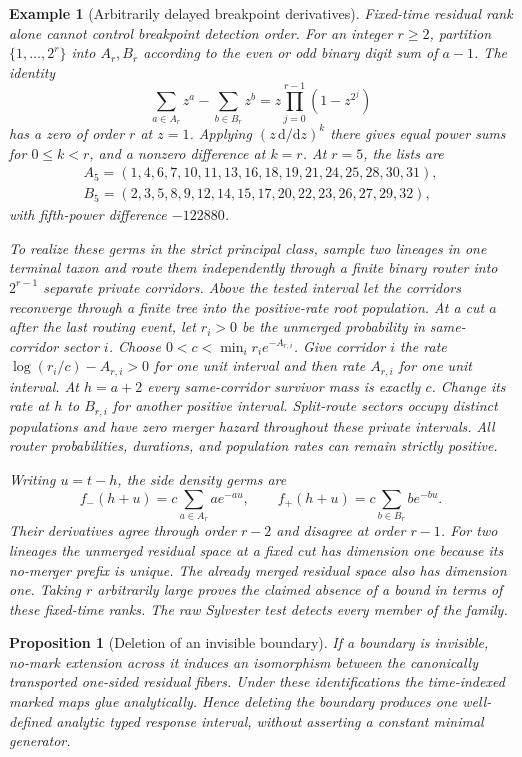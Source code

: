 \documentclass[11pt]{article}
\newtheorem{proposition}[theorem]{Proposition}
\newtheorem{example}[theorem]{Example}
\begin{document}
\begin{example}[Arbitrarily delayed breakpoint derivatives]
\label{ex:supp-high-order-breakpoint}
Fixed-time residual rank alone cannot control breakpoint detection order.  For an integer $r\ge2$, partition $\{1,\ldots,2^r\}$ into $A_r,B_r$ according to the even or odd binary digit sum of $a-1$.  The identity
\[
\sum_{a\in A_r}z^a-\sum_{b\in B_r}z^b
=z\prod_{j=0}^{r-1}(1-z^{2^j})
\]
has a zero of order $r$ at $z=1$.  Applying $(z\,\mathrm d/\mathrm dz)^k$ there gives equal power sums for $0\le k<r$, and a nonzero difference at $k=r$.  At $r=5$, the lists are
\[
\begin{split}
A_5=(1,4,6,7,10,11,13,16,18,19,21,24,25,28,30,31),\\
B_5=(2,3,5,8,9,12,14,15,17,20,22,23,26,27,29,32),
\end{split}
\]
with fifth-power difference $-122880$.

To realize these germs in the strict principal class, sample two lineages in one terminal taxon and route them independently through a finite binary router into $2^{r-1}$ separate private corridors.  Above the tested interval let the corridors reconverge through a finite tree into the positive-rate root population.  At a cut $a$ after the last routing event, let $r_i>0$ be the unmerged probability in same-corridor sector $i$.  Choose $0<c<\min_i r_i e^{-A_{r,i}}$.  Give corridor $i$ the rate $\log(r_i/c)-A_{r,i}>0$ for one unit interval and then rate $A_{r,i}$ for one unit interval.  At $h=a+2$ every same-corridor survivor mass is exactly $c$.  Change its rate at $h$ to $B_{r,i}$ for another positive interval.  Split-route sectors occupy distinct populations and have zero merger hazard throughout these private intervals.  All router probabilities, durations, and population rates can remain strictly positive.

Writing $u=t-h$, the side density germs are
\[
f_-(h+u)=c\sum_{a\in A_r}a e^{-au},\qquad
f_+(h+u)=c\sum_{b\in B_r}b e^{-bu}.
\]
Their derivatives agree through order $r-2$ and disagree at order $r-1$.  For two lineages the unmerged residual space at a fixed cut has dimension one because its no-merger prefix is unique.  The already merged residual space also has dimension one.  Taking $r$ arbitrarily large proves the claimed absence of a bound in terms of these fixed-time ranks.  The raw Sylvester test detects every member of the family.
\end{example}

\begin{proposition}[Deletion of an invisible boundary]
\label{prop:supp-delete-boundary}
If a boundary is invisible, no-mark extension across it induces an isomorphism between the canonically transported one-sided residual fibers.  Under these identifications the time-indexed marked maps glue analytically.  Hence deleting the boundary produces one well-defined analytic typed response interval, without asserting a constant minimal generator.
\end{proposition}
\end{document}

